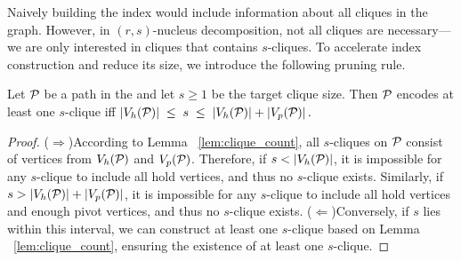 Naively building the index would include information about all cliques in the graph. 
However, in $(r,s)$-nucleus decomposition, not all cliques are necessary—we are only interested in cliques that contains $s$-cliques. 
To accelerate index construction and reduce its size, we introduce the following pruning rule.






\begin{lemma}\label{lem:path_pruning}
Let $\TPath{}$ be a path in the \cpi and let $s\ge 1$ be the target clique size.
Then $\TPath{}$ encodes at least one $s$-clique iff
$
   |V_h(\TPath{})| \;\le\; s \;\le\; |V_h(\TPath{})| + |V_p(\TPath{})|\,.
$
\end{lemma}

\begin{proof}
  ($\Rightarrow$)According to Lemma ~\ref{lem:clique_count}, all $s$-cliques on $\TPath{}$ consist of vertices from $V_h(\TPath{})$ and $V_p(\TPath{})$. 
  Therefore, if $s < |V_h(\TPath{})|$, it is impossible for any $s$-clique to include all hold vertices, and thus no $s$-clique exists. 
  Similarly, if $s > |V_h(\TPath{})| + |V_p(\TPath{})|$, it is impossible for any $s$-clique to include all hold vertices and enough pivot vertices, and thus no $s$-clique exists.
  ($\Leftarrow$)Conversely, if $s$ lies within this interval, we can construct at least one $s$-clique based on Lemma ~\ref{lem:clique_count}, ensuring the existence of at least one $s$-clique. 
\end{proof}

